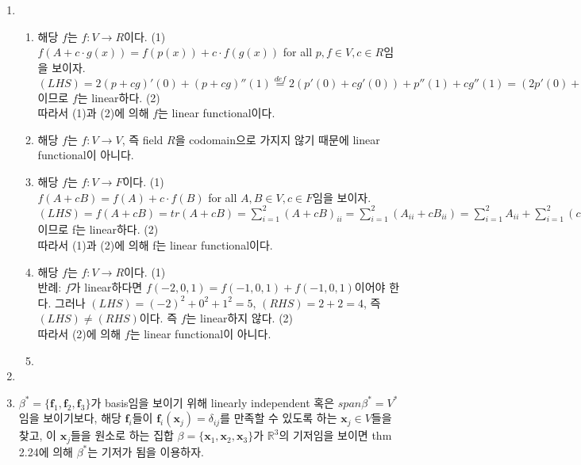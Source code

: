 \documentclass{oblivoir}
\begin{document}
\begin{enumerate}
    \item %
        \begin{enumerate}
            \item 해당 $f$는 $f\colon V \to R$이다. (1)\\
            $f(A+c\cdot g(x)) = f(p(x)) + c\cdot f(g(x))$ for all $p, f \in V, c \in R$임을 보이자. \\
            $(LHS) = 2(p+cg)'(0)+(p+cg)''(1) \stackrel{def}{=} 2(p'(0)+cg'(0)) + p''(1) + cg''(1) = (2p'(0)+p''(1)) + c(2g'(0) + g''(1)) = (RHS)$           
            이므로 $f$는 linear하다. (2)\\
            따라서 (1)과 (2)에 의해 $f$는 linear functional이다.
            \item 해당 $f$는 $f\colon V\to V$, 즉 field $R$을 codomain으로 가지지 않기 때문에 linear            functional이 아니다.
            \item 해당 $f$는 $f\colon V \to F$이다. (1)\\
            $f(A+cB) = f(A) + c\cdot f(B)$ for all $A, B \in V, c \in F$임을 보이자. $(LHS) = f(A+cB) = tr(A+cB) = \displaystyle{\sum_{i=1}^{2} {{(A+cB)}_{ii}}} = \sum_{i=1}^{2}(A_{ii} + cB_{ii}) = \sum_{i=1}^{2}A_{ii} + \sum_{i=1}^{2}(cB_{ii}) = tr(A) + tr(cB) = (RHS)$ 이므로 f는 linear하다. (2)\\
            따라서 (1)과 (2)에 의해 f는 linear functional이다.
            \item 해당 $f$는 $f\colon V \to R$이다. (1)\\
            반례: $f$가 linear하다면 $f(-2,0, 1) = f(-1, 0, 1) + f(-1, 0, 1)$이어야 한다. 그러나 $(LHS) = {(-2)}^{2} + {0}^{2} + {1}^{2} = 5$, $(RHS) = 2 + 2 = 4$, 즉 $(LHS) \neq (RHS)$이다. 즉 $f$는 linear하지 않다. (2)\\
            따라서 (2)에 의해 $f$는 linear functional이 아니다.
            \item 
        \end{enumerate}
    \item 
    \item\hypertarget{2.6_4}{} $\beta^*=\{{\textbf{f}}_{1}, {\textbf{f}}_{2}, {\textbf{f}}_{3}\}$가 basis임을 보이기 위해 linearly independent 혹은 $span{\beta}^* = V^*$ 임을 보이기보다, 해당 $\textbf{f}_i$들이 $\textbf{f}_i(\mathbf{x}_j)=\delta _{ij}$를 만족할 수 있도록 하는 $\mathbf{x}_j \in V$들을 찾고, 이 $\mathbf{x}_j$들을 원소로 하는 집합 $\beta=\{\mathbf{x}_1, \mathbf{x}_2, \mathbf{x}_3\}$가 ${\mathbb{R}}^3$의 기저임을 보이면 thm 2.24에 의해 $\beta^*$는 기저가 됨을 이용하자.\\

\end{enumerate}
\end{document}
